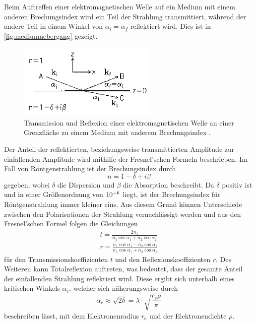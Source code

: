 Beim Auftreffen einer elektromagnetischen Welle auf ein Medium mit einem anderen Brechungsindex wird ein Teil der Strahlung transmittiert,
während der andere Teil in einem Winkel von $\alpha_i = \alpha_f$ reflektiert wird.
Dies ist in \autoref{fig:mediumuebergang} gezeigt.
\begin{figure}
    \centering
    \includegraphics[width=0.6\textwidth]{content/img/Abb_8.png}
    \caption{Transmission und Reflexion einer elektromagnetischen Welle an einer Grenzfläche zu einem Medium mit anderem Brechungsindex \cite{tolan}.}
    \label{fig:mediumuebergang}
\end{figure}
Der Anteil der reflektierten,
beziehungsweise transmittierten Amplitude zur einfallenden Amplitude wird mithilfe der Fresnel'schen Formeln beschrieben.
Im Fall von Röntgenstrahlung ist der Brechungsindex durch
\begin{equation}
    n = 1 - \delta + i \beta 
    \label{eqn:brechungsindex}
\end{equation}
gegeben,
wobei $\delta$ die Dispersion und $\beta$ die Absorption beschreibt.
Da $\delta$ positiv ist und in einer Größenordnung von $\num{e{-6}}$ liegt,
ist der Brechungsindex für Röntgenstrahlung immer kleiner eins.
Aus diesem Grund können Unterschiede zwischen den Polarisationen der Strahlung vernachlässigt werden und aus den Fresnel'schen Formel folgen die Gleichungen
\begin{gather}
    t = \frac{2n_1}{n_1 \cos{\alpha_1} + n_2 \cos{\alpha_2}} \\
    r = \frac{n_1 \cos{\alpha_1} - n_2 \cos{\alpha_2}}{n_1 \cos{\alpha_1} + n_2 \cos{\alpha_2}}
\end{gather}
für den Transmissionskoeffizienten $t$ und den Reflexionskoeffizienten $r$.
Des Weiteren kann Totalreflexion auftreten,
was bedeutet,
dass der gesamte Anteil der einfallenden Strahlung reflektiert wird.
Diese ergibt sich unterhalb eines kritischen Winkels $\alpha_\text{c}$,
welcher sich näherungsweise durch 
\begin{equation}
    \alpha_\text{c} \approx \sqrt{2 \delta} = \lambda \cdot \sqrt{\frac{r_\text{e} \rho}{\pi}}
\end{equation}
beschreiben lässt,
mit dem Elektronenradius $r_\text{e}$ und der Elektronendichte $\rho$.

